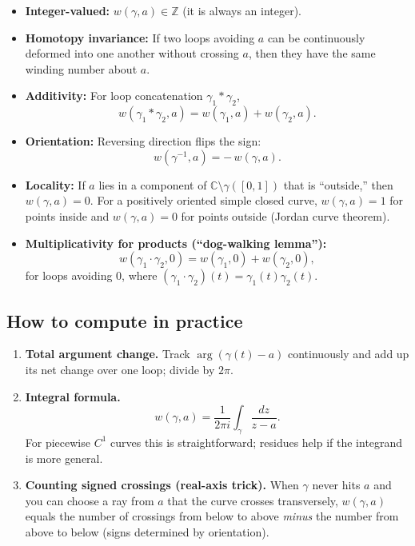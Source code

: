 \documentclass[12pt,a4paper]{article}
\theoremstyle{plain}
\theoremstyle{definition}
\theoremstyle{remark}
\theoremstyle{remark}
\begin{document}
\begin{itemize}
	\item \textbf{Integer-valued:}
	\(w(\gamma,a)\in\mathbb{Z}\) (it is always an integer).
	
	\item \textbf{Homotopy invariance:}
	If two loops avoiding \(a\) can be continuously deformed into one another
	without crossing \(a\), then they have the same winding number about \(a\).
	
	\item \textbf{Additivity:}
	For loop concatenation \(\gamma_1 * \gamma_2\),
	\[
	w(\gamma_1 * \gamma_2,a)
	= w(\gamma_1,a) + w(\gamma_2,a).
	\]
	
	\item \textbf{Orientation:}
	Reversing direction flips the sign:
	\[
	w(\gamma^{-1},a) = -\,w(\gamma,a).
	\]
	
	\item \textbf{Locality:}
	If \(a\) lies in a component of \(\mathbb{C}\setminus\gamma([0,1])\) that is “outside,”
	then \(w(\gamma,a)=0\).
	For a positively oriented simple closed curve,
	\(w(\gamma,a)=1\) for points inside and \(w(\gamma,a)=0\) for points outside
	(Jordan curve theorem).
	
	\item \textbf{Multiplicativity for products (“dog-walking lemma”):}
	\[
	w(\gamma_1\cdot\gamma_2,0)
	= w(\gamma_1,0) + w(\gamma_2,0),
	\]
	for loops avoiding \(0\), where
	\((\gamma_1\cdot\gamma_2)(t)=\gamma_1(t)\gamma_2(t)\).
\end{itemize}

\bigskip
\subsection*{How to compute in practice}

\begin{enumerate}
	\item \textbf{Total argument change.}
	Track \(\arg(\gamma(t)-a)\) continuously and add up its net change over one loop;
	divide by \(2\pi\).
	
	\item \textbf{Integral formula.}
	\[
	w(\gamma,a) = \frac{1}{2\pi i}\int_\gamma \frac{dz}{z-a}.
	\]
	For piecewise \(C^1\) curves this is straightforward; residues help
	if the integrand is more general.
	
	\item \textbf{Counting signed crossings (real-axis trick).}
	When \(\gamma\) never hits \(a\) and you can choose a ray from \(a\)
	that the curve crosses transversely,
	\(w(\gamma,a)\) equals the number of crossings from below to above
	\emph{minus} the number from above to below
	(signs determined by orientation).
\end{enumerate}
\end{document}
